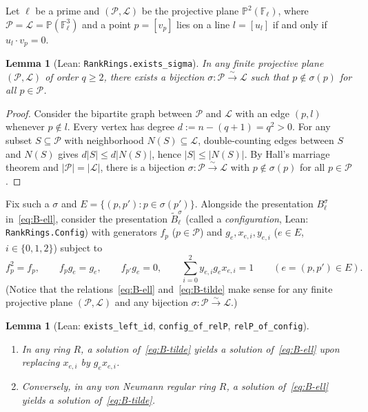 \documentclass[11pt]{article}
\newtheorem{lemma}[theorem]{Lemma}
\theoremstyle{definition}
\theoremstyle{remark}
\numberwithin{equation}{section}
\newcommand{\F}{\mathbb{F}}
\newcommand{\PP}{\mathcal{P}}
\newcommand{\LL}{\mathcal{L}}
\newcommand{\1}{\mathbf{1}}
\newcommand{\code}[1]{{\normalfont\small\texttt{#1}}}
\begin{document}
Let $\ell$ be a prime and $(\PP, \LL)$ be the projective plane $\mathbb{P}^2(\F_\ell)$, where $\PP = \LL = \mathbb{P}(\F_\ell^3)$ and a point $p = [v_p]$ lies on a line $l = [u_l]$ if and only if $u_l \cdot v_p = 0$.

\begin{lemma}[Lean: \code{RankRings.exists\_sigma}]
\label{lem:hall-sigma}
In any finite projective plane $(\PP, \LL)$ of order $q \ge 2$, there exists a bijection $\sigma\colon \PP \xrightarrow{\sim} \LL$ such that $p \notin \sigma(p)$ for all $p \in \PP$.
\end{lemma}

\begin{proof}
Consider the bipartite graph between $\PP$ and $\LL$ with an edge $(p, l)$ whenever $p \notin l$. Every vertex has degree $d := n - (q + 1) = q^2 > 0$. For any subset $S \subseteq \PP$ with neighborhood $N(S) \subseteq \LL$, double-counting edges between $S$ and $N(S)$ gives $d|S| \le d|N(S)|$, hence $|S| \le |N(S)|$. By Hall's marriage theorem and $|\PP| = |\LL|$, there is a bijection $\sigma\colon \PP \xrightarrow{\sim} \LL$ with $p \notin \sigma(p)$ for all $p \in \PP$.
\end{proof}

Fix such a $\sigma$ and $E = \{(p, p') : p \in \sigma(p')\}$. Alongside the presentation $B_\ell^\sigma$ in~\eqref{eq:B-ell}, consider the presentation $\widetilde{B}_\ell^\sigma$ (called a \emph{configuration}, Lean: \code{RankRings.Config}) with generators $f_p$ ($p \in \PP$) and $g_e, x_{e,i}, y_{e,i}$ ($e \in E$, $i \in \{0,1,2\}$) subject to
\begin{equation}
\label{eq:B-tilde}
f_p^2 = f_p, \qquad f_p g_e = g_e, \qquad f_{p'} g_e = 0, \qquad \sum_{i=0}^{2} y_{e,i} g_e x_{e,i} = 1 \qquad (e = (p, p') \in E).
\end{equation}
(Notice that the relations~\eqref{eq:B-ell} and~\eqref{eq:B-tilde} make sense for any finite projective plane $(\PP, \LL)$ and any bijection $\sigma\colon \PP \xrightarrow{\sim} \LL$.)

\begin{lemma}[Lean: \code{exists\_left\_id}, \code{config\_of\_relP}, \code{relP\_of\_config}]
\label{lem:B-equiv}
\leavevmode
\begin{enumerate}[label=\textup{(\alph*)},leftmargin=2.2em]
\item In any ring $R$, a solution of~\eqref{eq:B-tilde} yields a solution of~\eqref{eq:B-ell} upon replacing $x_{e,i}$ by $g_e x_{e,i}$.
\item Conversely, in any von Neumann regular ring $R$, a solution of~\eqref{eq:B-ell} yields a solution of~\eqref{eq:B-tilde}.
\end{enumerate}
\end{lemma}
\end{document}
